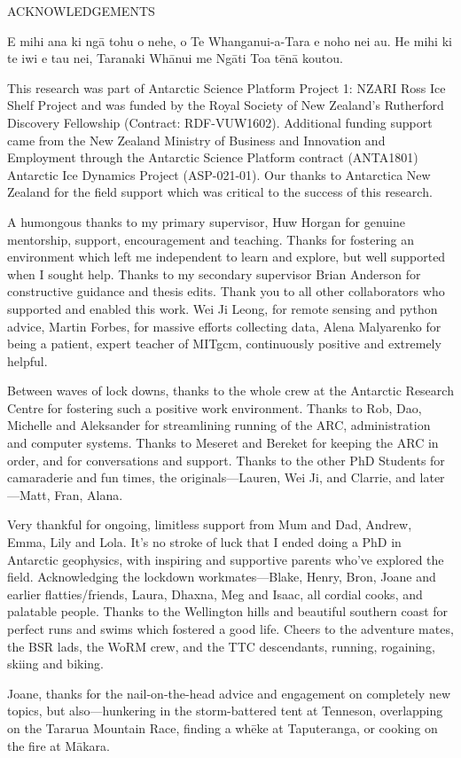 \newpage
{}

\begin{center}
ACKNOWLEDGEMENTS
\end{center}

E mihi ana ki ng\=a tohu o nehe, o Te Whanganui-a-Tara e noho nei au.
He mihi ki te iwi e tau nei, Taranaki Wh\=anui me Ng\=ati Toa t\=en\=a koutou.

This research was part of Antarctic Science Platform Project 1: NZARI Ross Ice Shelf Project and was funded by the Royal Society of New Zealand’s Rutherford Discovery Fellowship (Contract: RDF-VUW1602). 
Additional funding support came from the New Zealand Ministry of Business and Innovation and Employment through the Antarctic Science Platform contract (ANTA1801) Antarctic Ice Dynamics Project (ASP-021-01). 
Our thanks to Antarctica New Zealand for the field support which was critical to the success of this research. 

A humongous thanks to my primary supervisor, Huw Horgan for genuine mentorship, support, encouragement and teaching. Thanks for fostering an environment which left me independent to learn and explore, but well supported when I sought help. Thanks to my secondary supervisor Brian Anderson for constructive guidance and thesis edits. 
Thank you to all other collaborators who supported and enabled this work. Wei Ji Leong, for remote sensing and python advice, Martin Forbes, for massive efforts collecting data, Alena Malyarenko for being a patient, expert teacher of MITgcm, continuously positive and extremely helpful.

Between waves of lock downs, thanks to the whole crew at the Antarctic Research Centre for fostering such a positive work environment. Thanks to Rob, Dao, Michelle and Aleksander for streamlining running of the ARC, administration and computer systems. Thanks to Meseret and Bereket for keeping the ARC in order, and for conversations and support. Thanks to the other PhD Students for camaraderie and fun times, the originals---Lauren, Wei Ji, and Clarrie, and later---Matt, Fran, Alana. 

Very thankful for ongoing, limitless support from Mum and Dad, Andrew, Emma, Lily and Lola.  It's no stroke of luck that I ended doing a PhD in Antarctic geophysics, with inspiring and supportive parents who've explored the field. Acknowledging the lockdown workmates---Blake, Henry, Bron, Joane and earlier flatties/friends, Laura, Dhaxna, Meg and Isaac, all cordial cooks, and palatable people.   
Thanks to the Wellington hills and beautiful southern coast for perfect runs and swims which fostered a good life. Cheers to the adventure mates, the BSR lads, the WoRM crew, and the TTC descendants, running, rogaining, skiing and biking.

Joane, thanks for the nail-on-the-head advice and engagement on completely new topics, but also---hunkering in the storm-battered tent at Tenneson, overlapping on the Tararua Mountain Race, finding a wh\=eke at Taputeranga, or cooking on the fire at M\=akara. 